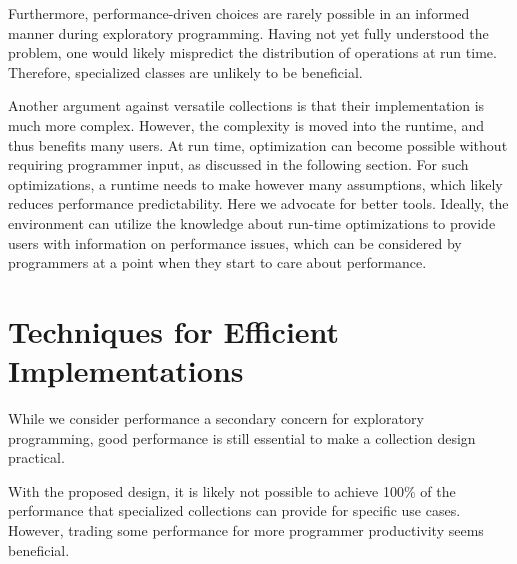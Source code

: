 \documentclass[sigconf, authorversion]{acmart}
\begin{document}

Furthermore, performance-driven choices are 
rarely possible in an informed manner during
exploratory programming.
Having not yet fully understood the problem,
one would likely mispredict the distribution of operations at run time.
Therefore, specialized classes are unlikely to be beneficial.

Another argument against versatile collections is
that their implementation is much more complex.
However, the complexity is moved into the runtime,
and thus benefits many users.
At run time, optimization can become possible
without requiring programmer input,
as discussed in the following section.
For such optimizations, a runtime needs to make however many assumptions,
which likely reduces performance predictability.
Here we advocate for better tools.
Ideally, the environment can utilize the knowledge about run-time optimizations
to provide users with information on performance issues,
which can be considered by programmers
at a point when they start to care about performance.



\section{Techniques for Efficient Implementations}
\label{sec:impl-techniques}

While we consider performance a secondary concern for exploratory programming,
good performance is still essential to make a collection design practical.

With the proposed design, it is likely not possible to achieve 100\%
of the performance that specialized collections can provide
for specific use cases.
However, trading some performance for more programmer productivity
seems beneficial.
\end{document}
